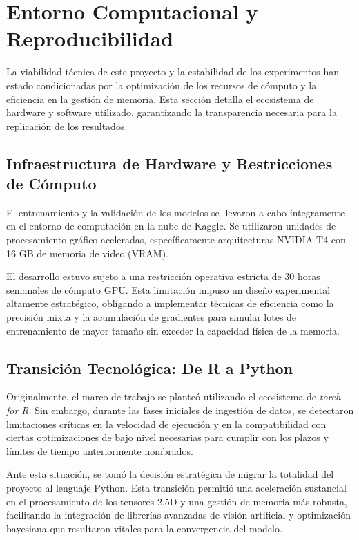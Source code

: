 \documentclass[12pt, oneside, english, spanish]{book}
\begin{document}
\section{Entorno Computacional y Reproducibilidad} \label{sec:entorno_computacional}

La viabilidad técnica de este proyecto y la estabilidad de los experimentos han estado condicionadas por la optimización de los recursos de cómputo y la eficiencia en la gestión de memoria. Esta sección detalla el ecosistema de hardware y software utilizado, garantizando la transparencia necesaria para la replicación de los resultados.

\subsection{Infraestructura de Hardware y Restricciones de Cómputo} \label{subsec:hardware_kaggle}
El entrenamiento y la validación de los modelos se llevaron a cabo íntegramente en el entorno de computación en la nube de Kaggle. Se utilizaron unidades de procesamiento gráfico aceleradas, específicamente arquitecturas NVIDIA T4 con 16 GB de memoria de video (VRAM). 

El desarrollo estuvo sujeto a una restricción operativa estricta de 30 horas semanales de cómputo GPU. Esta limitación impuso un diseño experimental altamente estratégico, obligando a implementar técnicas de eficiencia como la precisión mixta y la acumulación de gradientes para simular lotes de entrenamiento de mayor tamaño sin exceder la capacidad física de la memoria.

\subsection{Transición Tecnológica: De R a Python} \label{subsec:transicion_python}
Originalmente, el marco de trabajo se planteó utilizando el ecosistema de \textit{torch for R}. Sin embargo, durante las fases iniciales de ingestión de datos, se detectaron limitaciones críticas en la velocidad de ejecución y en la compatibilidad con ciertas optimizaciones de bajo nivel necesarias para cumplir con los plazos y límites de tiempo anteriormente nombrados. 

Ante esta situación, se tomó la decisión estratégica de migrar la totalidad del proyecto al lenguaje Python. Esta transición permitió una aceleración sustancial en el procesamiento de los tensores 2.5D y una gestión de memoria más robusta, facilitando la integración de librerías avanzadas de visión artificial y optimización bayesiana que resultaron vitales para la convergencia del modelo.
\end{document}
